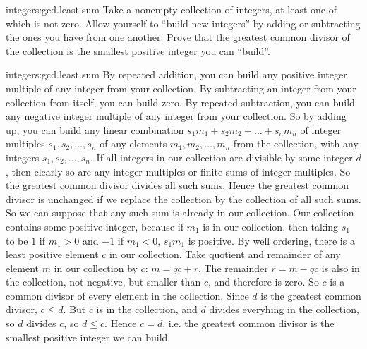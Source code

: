 \begin{problem*}{integers:gcd.least.sum}
Take a nonempty collection of integers, at least one of which is not zero.
Allow yourself to ``build new integers'' by adding or subtracting the ones you have from one another.
Prove that the greatest common divisor of the collection is the smallest positive integer you can ``build''.
\end{problem*}
\begin{answer}{integers:gcd.least.sum}
By repeated addition, you can build any positive integer multiple of any integer from your collection.
By subtracting an integer from your collection from itself,  you can build zero.
By repeated subtraction, you can build any negative integer multiple of any integer from your collection.
So by adding up, you can build any linear combination \(s_1m_1+s_2m_2+\dots+s_nm_n\) of integer multiples \(s_1,s_2,\dots,s_n\) of any elements \(m_1,m_2,\dots,m_n\) from the collection,  with any integers \(s_1,s_2,\dots,s_n\).
If all integers in our collection are divisible by some integer \(d\), then clearly so are any integer multiples or finite sums of integer multiples.
So the greatest common divisor divides all such sums.
Hence the greatest common divisor is unchanged if we replace the collection by the collection of all such sums.
So we can suppose that any such sum is already in our collection.
Our collection contains some positive integer, because if \(m_1\) is in our collection, then taking \(s_1\) to be \(1\) if \(m_1>0\) and \(-1\) if \(m_1<0\), \(s_1m_1\) is positive.
By well ordering, there is a least positive element \(c\) in our collection.
Take quotient and remainder of any element \(m\) in our collection by \(c\): \(m=qc+r\).
The remainder \(r=m-qc\) is also in the collection, not negative, but smaller than \(c\), and therefore is zero.
So \(c\) is a common divisor of every element in the collection.
Since \(d\) is the greatest common divisor, \(c\le d\).
But \(c\) is in the collection, and \(d\) divides everyhing in the collection, so \(d\) divides \(c\), so \(d\le c\).
Hence \(c=d\), i.e. the greatest common divisor is the smallest positive integer we can build.
\end{answer}

